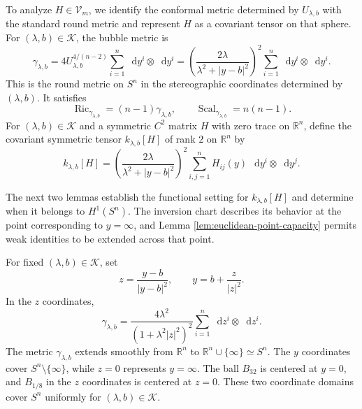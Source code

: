 \documentclass[11pt]{article}
\numberwithin{equation}{section}
\theoremstyle{remark}
\newcommand{\R}{\mathbb R}
\newcommand{\Sph}{S}
\newcommand{\dd}{\mathop{}\!\mathrm{d}}
\begin{document}
To analyze \(H\in\mathcal V_m\), we identify the conformal metric determined by
\(U_{\lambda,b}\) with the standard round metric and represent \(H\) as a
covariant tensor on that sphere. For \((\lambda,b)\in\mathcal K\), the
bubble metric is
\begin{equation}\label{eq:bubble-metric}
 \gamma_{\lambda,b}
 =4U_{\lambda,b}^{4/(n-2)}
 \sum_{i=1}^n\dd y^i\otimes\dd y^i
 =\left(\frac{2\lambda}
 {\lambda^2+|y-b|^2}\right)^2
 \sum_{i=1}^n\dd y^i\otimes\dd y^i.
\end{equation}
This is the round metric on \(\Sph^n\) in the stereographic coordinates
determined by \((\lambda,b)\).
It satisfies
\[
 \operatorname{Ric}_{\gamma_{\lambda,b}}
 =(n-1)\gamma_{\lambda,b},\qquad
 \operatorname{Scal}_{\gamma_{\lambda,b}}=n(n-1).
\]
For \((\lambda,b)\in\mathcal K\) and a symmetric \(C^2\) matrix \(H\) with zero trace
on \(\R^n\), define the
covariant symmetric tensor \(k_{\lambda,b}[H]\) of rank \(2\) on \(\R^n\) by
\[
 k_{\lambda,b}[H]
 =\left(\frac{2\lambda}
 {\lambda^2+|y-b|^2}\right)^2
 \sum_{i,j=1}^nH_{ij}(y)\,\dd y^i\otimes\dd y^j.
\]

The next two lemmas establish the functional setting for
\(k_{\lambda,b}[H]\) and determine when it belongs to
\(H^1(\Sph^n)\). The inversion chart describes its behavior at
the point corresponding to \(y=\infty\), and Lemma
\ref{lem:euclidean-point-capacity} permits weak identities to be extended
across that point.

For fixed
\((\lambda,b)\in\mathcal K\), set
\begin{equation}\label{eq:inversion-chart}
 z=\frac{y-b}{|y-b|^2},\qquad
 y=b+\frac{z}{|z|^2}.
\end{equation}
In the \(z\) coordinates,
\begin{equation}\label{eq:inverted-bubble-metric}
 \gamma_{\lambda,b}
 =\frac{4\lambda^2}{(1+\lambda^2|z|^2)^2}
 \sum_{i=1}^n\dd z^i\otimes\dd z^i.
\end{equation}
The metric \(\gamma_{\lambda,b}\) extends smoothly from \(\R^n\) to
\(\R^n\cup\{\infty\}\simeq\Sph^n\). The \(y\) coordinates cover
\(\Sph^n\setminus\{\infty\}\), while \(z=0\) represents \(y=\infty\).
The ball \(B_{32}\) is centered at \(y=0\), and \(B_{1/8}\) in the
\(z\) coordinates is centered at \(z=0\). These two coordinate domains cover
\(\Sph^n\) uniformly for \((\lambda,b)\in\mathcal K\).
\end{document}
